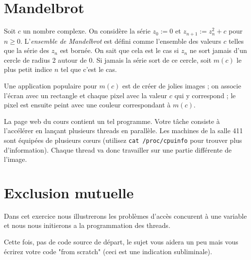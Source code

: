 \documentclass[11pt]{article}
\newcommand{\numtd}{09}
\newcommand{\titretd}{Programmation}
\begin{document}
\entete{\numtd}{\titretd}

\section{Mandelbrot}

Soit $c$ un nombre complexe. On considère la série
$z_0:=0$ et $z_{n+1}:=z_n^2+c$ pour $n\ge0$. L'\emph{ensemble de Mandelbrot}
est défini comme l'ensemble des valeurs $c$ telles que la série des $z_n$
est bornée. On sait que cela est le cas si $z_n$ ne sort jamais d'un
cercle de radius 2 autour de 0. Si jamais la série sort de ce cercle,
soit $m(c)$ le plus petit indice $n$ tel que c'est le cas.

Une application populaire pour $m(c)$ est de créer
de jolies images ; on associe l'écran avec un rectangle et chaque pixel
avec la valeur $c$ qui y correspond ; le pixel est ensuite peint avec
une couleur correspondant à $m(c)$.

La page web du cours contient un tel programme. Votre tâche consiste
à l'accélérer en lançant plusieurs threads en parallèle.
Les machines de la salle 411 sont équipées de plusieurs c\oe{}urs
(utilisez \texttt{cat /proc/cpuinfo} pour trouver plus d'information).
Chaque thread va donc travailler sur une partie différente de l'image.

\section{Exclusion mutuelle}

Dans cet exercice nous illustrerons les problèmes d'accès concurent à une variable et nous nous initierons a la programmation des threads.

Cette fois, pas de code source de départ, le sujet vous aidera un peu mais vous écrirez votre code "from scratch" (ceci est une indication subliminale).
\end{document}
